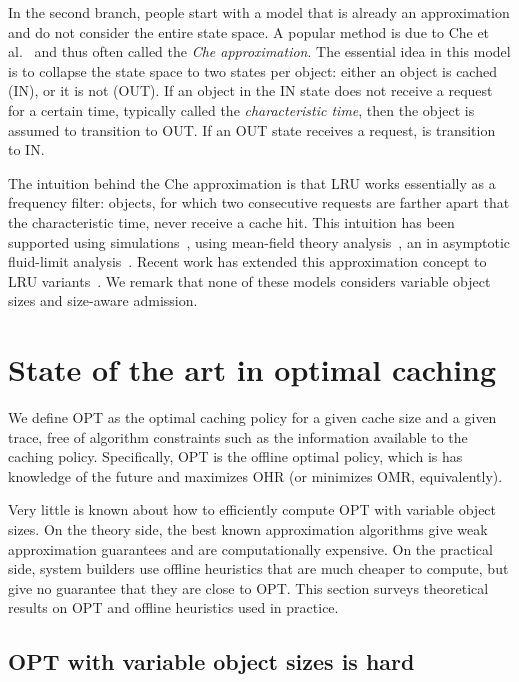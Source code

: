 \documentclass{article}
\begin{document}
In the second branch, people start with a model that is already an approximation and do not consider the entire state space.
A popular method is due to Che et al.~\cite{che2002hierarchical} and thus often called the \emph{Che approximation}.
The essential idea in this model is to collapse the state space to two states per object: either an object is cached (IN), or it is not (OUT).
If an object in the IN state does not receive a request for a certain time, typically called the \emph{characteristic time}, then the object is assumed to transition to OUT.
If an OUT state receives a request, is transition to IN.

The intuition behind the Che approximation is that LRU works essentially as a frequency filter: objects, for which two consecutive requests are farther apart that the characteristic time, never receive a cache hit.
This intuition has been supported using simulations~\cite{che2002hierarchical}, using mean-field theory analysis~\cite{fricker2012lru}, an in asymptotic fluid-limit analysis~\cite{osogami2010fluid}.
Recent work has extended this approximation concept to LRU variants~\cite{fricker2012lru, bianchi2013check,martina13}.
We remark that none of these models considers variable object sizes and size-aware admission.


\section{State of the art in optimal caching}\label{sec:background:optimal}

We define OPT as the optimal caching policy for a given cache size and a given trace, free of algorithm constraints such as the information available to the caching policy.
Specifically, OPT is the offline optimal policy, which is has knowledge of the future and maximizes OHR (or minimizes OMR, equivalently).

Very little is known about how to efficiently compute OPT with variable object sizes.
On the theory side, the best known approximation algorithms give weak approximation guarantees and are computationally expensive.
On the practical side, system builders use offline heuristics that are much cheaper to compute, but give no guarantee that they are close to OPT.
This section surveys theoretical results on OPT and offline heuristics used in practice.

\subsection{OPT with variable object sizes is hard}
\end{document}
